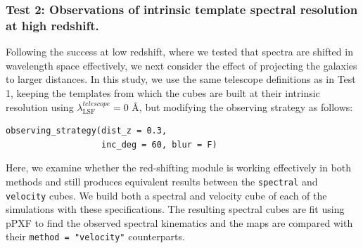 \documentclass[
  journal=pasa,
  manuscript=research-paper, %
  year=2020,
  volume=37,
]{cup-journal}
\begin{document}



\subsubsection*{Test 2: Observations of intrinsic template spectral resolution at high redshift. \\ }

Following the success at low redshift, where we tested that spectra are shifted in wavelength space effectively, we next consider the effect of projecting the galaxies to larger distances. 
In this study, we use the same telescope definitions as in Test 1, keeping the templates from which the cubes are built at their intrinsic resolution using $\lambda_{\text{LSF}}^{telescope} = 0$ \AA, but modifying the observing strategy as follows:
\begin{lstlisting}[basicstyle=\fontsize{6}{8}\selectfont\ttfamily]
observing_strategy(dist_z = 0.3, 
                   inc_deg = 60, blur = F)
\end{lstlisting}

Here, we examine whether the red-shifting module is working effectively in both methods and still produces equivalent results between the \texttt{spectral} and \texttt{velocity} cubes.
We build both a spectral and velocity cube of each of the simulations with these specifications.
The resulting spectral cubes are fit using pPXF to find the observed spectral kinematics and the maps are compared with their \texttt{method = "velocity"} counterparts. 
\end{document}

